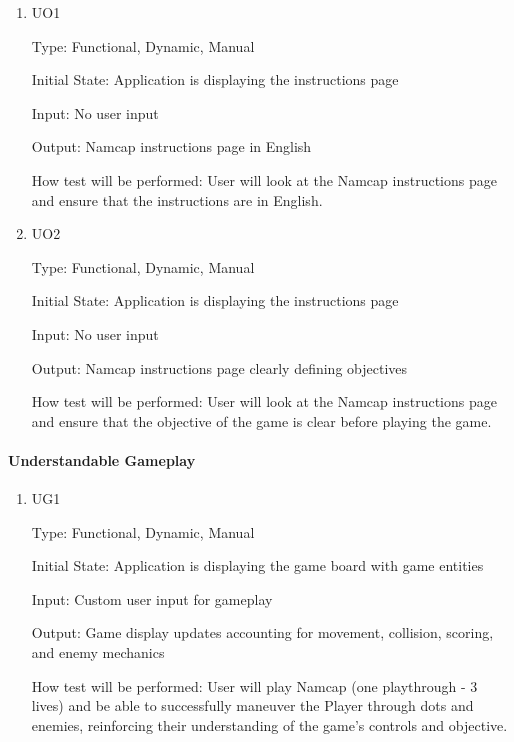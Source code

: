 \documentclass[12pt, titlepage]{article}
\begin{document}
\begin{enumerate}

\item{UO1\\}

Type: Functional, Dynamic, Manual
					
Initial State: Application is displaying the instructions page
					
Input: No user input
					
Output: Namcap instructions page in English
					
How test will be performed: User will look at the Namcap instructions page and ensure that the instructions are in English.
					
\item{UO2\\}

Type: Functional, Dynamic, Manual
					
Initial State: Application is displaying the instructions page
					
Input: No user input
					
Output: Namcap instructions page clearly defining objectives
					
How test will be performed: User will look at the Namcap instructions page and ensure that the objective of the game is clear before playing the game.

\end{enumerate}

\paragraph{Understandable Gameplay}

\begin{enumerate}

\item{UG1\\}

Type: Functional, Dynamic, Manual
					
Initial State: Application is displaying the game board with game entities
					
Input: Custom user input for gameplay
					
Output: Game display updates accounting for movement, collision, scoring, and enemy mechanics
					
How test will be performed: User will play Namcap (one playthrough - 3 lives) and be able to successfully maneuver the Player through dots and enemies, reinforcing their understanding of the game's controls and objective.

\end{enumerate}
\end{document}
